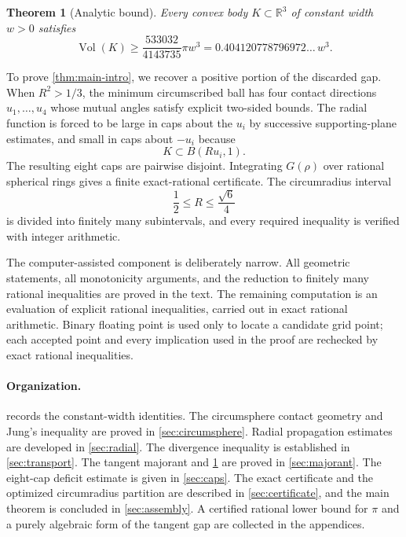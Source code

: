 \documentclass[11pt,reqno]{amsart}
\numberwithin{equation}{section}
\newtheorem{theorem}{Theorem}[section]
\theoremstyle{definition}
\theoremstyle{remark}
\newcommand{\R}{\mathbb{R}}
\newcommand{\Vol}{\operatorname{Vol}}
\begin{document}
\begin{theorem}[Analytic bound]\label{thm:analytic-intro}
Every convex body $K\subset\R^{3}$ of constant width $w>0$ satisfies
\begin{equation}\label{eq:analytic-bound-intro}
 \Vol(K)\geq \frac{533032}{4143735}\pi w^{3}
 =0.404120778796972\ldots\,w^{3}.
\end{equation}
\end{theorem}

To prove \cref{thm:main-intro}, we recover a positive portion of the discarded gap. When $R^{2}>1/3$, the minimum circumscribed ball has four contact directions $u_1,\dots,u_4$ whose mutual angles satisfy explicit two-sided bounds. The radial function is forced to be large in caps about the $u_i$ by successive supporting-plane estimates, and small in caps about $-u_i$ because
\[
 K\subset B(Ru_i,1).
\]
The resulting eight caps are pairwise disjoint. Integrating $G(\rho)$ over rational spherical rings gives a finite exact-rational certificate. The circumradius interval
\[
 \frac12\leq R\leq \frac{\sqrt6}{4}
\]
is divided into finitely many subintervals, and every required inequality is verified with integer arithmetic.

The computer-assisted component is deliberately narrow. All geometric statements, all monotonicity arguments, and the reduction to finitely many rational inequalities are proved in the text. The remaining computation is an evaluation of explicit rational inequalities, carried out in exact rational arithmetic. Binary floating point is used only to locate a candidate grid point; each accepted point and every implication used in the proof are rechecked by exact rational inequalities.

\paragraph{Organization.}
 records the constant-width identities. The circumsphere contact geometry and Jung's inequality are proved in \cref{sec:circumsphere}. Radial propagation estimates are developed in \cref{sec:radial}. The divergence inequality is established in \cref{sec:transport}. The tangent majorant and \cref{thm:analytic-intro} are proved in \cref{sec:majorant}. The eight-cap deficit estimate is given in \cref{sec:caps}. The exact certificate and the optimized circumradius partition are described in \cref{sec:certificate}, and the main theorem is concluded in \cref{sec:assembly}. A certified rational lower bound for $\pi$ and a purely algebraic form of the tangent gap are collected in the appendices.
\end{document}
